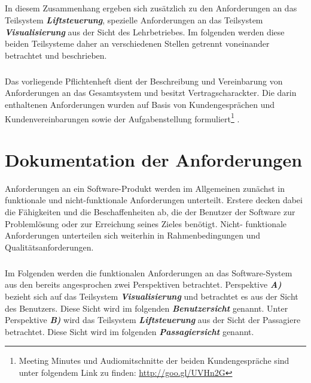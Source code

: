 \paragraph{}
In diesem Zusammenhang ergeben sich zusätzlich zu den Anforderungen an das Teilsystem \textit{\textbf{Liftsteuerung}}, spezielle Anforderungen an das Teilsystem \textit{\textbf{Visualisierung}} aus der Sicht des Lehrbetriebes. Im folgenden werden diese beiden Teilsysteme daher an verschiedenen Stellen getrennt voneinander betrachtet und beschrieben.

\paragraph{}
Das vorliegende Pflichtenheft dient der Beschreibung und Vereinbarung von Anforderungen an das Gesamtsystem und besitzt Vertragscharackter. Die darin enthaltenen Anforderungen wurden auf Basis von Kundengesprächen und Kundenvereinbarungen sowie der Aufgabenstellung formuliert\footnote{Meeting Minutes und Audiomitschnitte der beiden Kundengespräche sind unter folgendem Link zu finden: \url{http://goo.gl/UVHn2G}} . 

\chapter{Dokumentation der Anforderungen}
Anforderungen an ein Software-Produkt werden im Allgemeinen zunächst in funktionale und nicht-funktionale Anforderungen unterteilt. Erstere decken dabei die Fähigkeiten und die Beschaffenheiten ab, die der Benutzer der Software zur Problemlösung oder zur Erreichung seines Zieles benötigt. Nicht- funktionale Anforderungen unterteilen sich weiterhin in Rahmenbedingungen und Qualitätsanforderungen.

\paragraph{}
Im Folgenden werden die funktionalen Anforderungen an das Software-System aus den bereits angesprochen zwei Perspektiven betrachtet. Perspektive \textit{\textbf{A)}} bezieht sich auf das Teilsystem \textit{\textbf{Visualisierung}} und betrachtet es aus der Sicht des Benutzers. Diese Sicht wird im folgenden \textit{\textbf{Benutzersicht}} genannt. Unter Perspektive \textit{\textbf{B)}} wird das Teilsystem \textit{\textbf{Liftsteuerung}} aus der Sicht der Passagiere betrachtet. Diese Sicht wird im folgenden \textit{\textbf{Passagiersicht}} genannt.

